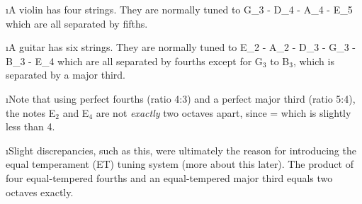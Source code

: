 \i A violin has four strings.  
They are normally tuned to
\be
{\rm G_3 - D_4 - A_4 - E_5}
\ee
which are all separated by fifths.

\i A guitar has six strings.
They are normally tuned to
\be
{\rm E_2 - A_2 - D_3 - G_3 - B_3 - E_4}
\ee
which are all separated by fourths 
except for G$_3$ to B$_3$, which is separated by a 
major third.

\i Note that using perfect fourths (ratio 4:3) and
a perfect major third (ratio 5:4), the notes E$_2$ and
E$_4$ are not {\em exactly} two octaves apart, since
%
\be
{}\cdot
{}\cdot
{}\cdot
{}\cdot
{}
= 
\ee
%
which is slightly less than 4.

\i Slight discrepancies, such as this, were ultimately 
the reason for introducing the equal temperament (ET) tuning 
system (more about this later). 
The product of four equal-tempered fourths and an 
equal-tempered major third equals two octaves exactly.

\ei
